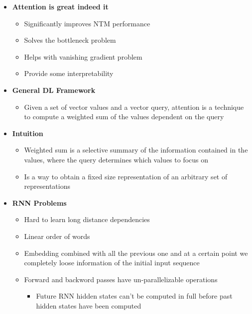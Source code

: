 \begin{itemize}
\begin{itemize}
    \end{itemize}
    \item \textbf{Attention is great indeed it}
    \begin{itemize}
        \item Significantly improves NTM performance
        \item Solves the bottleneck problem
        \item Helps with vanishing gradient problem
        \item Provide some interpretability
    \end{itemize}
    \item \textbf{General DL Framework}
    \begin{itemize}
        \item Given a set of vector values and a vector query, attention is a technique to compute a weighted sum of the values dependent on the query
    \end{itemize}
    \item \textbf{Intuition}
    \begin{itemize}
        \item Weighted sum is a selective summary of the information contained in the values, where the query determines which values to focus on
        \item Is a way to obtain a fixed size representation of an arbitrary set of representations
    \end{itemize}
    \item \textbf{RNN Problems}
    \begin{itemize}
        \item Hard to learn long distance dependencies
        \item Linear order of words
        \item Embedding combined with all the previous one and at a certain point we completely loose information of the initial input sequence
        \item Forward and backword passes have un-parallelizable operations
        \begin{itemize}
            \item Future RNN hidden states can't be computed in full before past hidden states have been computed
        \end{itemize}
    \end{itemize}
\end{itemize}



